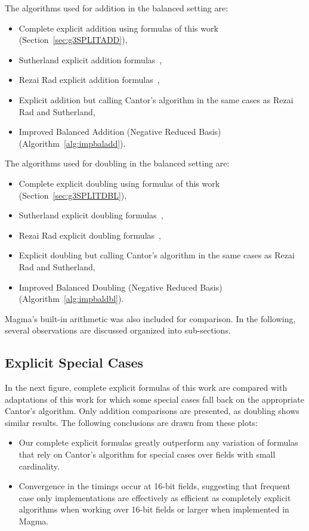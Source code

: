 The algorithms used for addition in the balanced setting are: 
\begin{itemize}
    \item Complete explicit addition using formulas of this work (Section~\ref{sec:g3SPLITADD}),
    \item Sutherland explicit addition formulas~\cite{Sutherland_g3_2019},
    \item Rezai Rad explicit addition formulas~\cite{rad2019jacobian},
    \item Explicit addition but calling Cantor's algorithm in the same cases as Rezai Rad and Sutherland,
    \item Improved Balanced Addition (Negative Reduced Basis) (Algorithm~\ref{alg:impbaladd}).
\end{itemize} 
The algorithms used for doubling in the balanced setting are: 
\begin{itemize}
    \item Complete explicit doubling using formulas of this work (Section~\ref{sec:g3SPLITDBL}),
    \item Sutherland explicit doubling formulas~\cite{Sutherland_g3_2019},
    \item Rezai Rad explicit doubling formulas~\cite{rad2019jacobian},
    \item Explicit doubling but calling Cantor's algorithm in the same cases as Rezai Rad and Sutherland,
    \item Improved Balanced Doubling (Negative Reduced Basis) (Algorithm~\ref{alg:impbaldbl}).
\end{itemize} Magma's built-in arithmetic was also included for comparison.
In the following, several observations are discussed organized into sub-sections.

\subsection{Explicit Special Cases}

In the next figure, complete explicit formulas of this work are compared
with adaptations of this work for which some special cases fall back on the appropriate
Cantor's algorithm. Only addition comparisons are presented, as
doubling shows similar results. The following conclusions are drawn from these
plots:
\begin{itemize}
    \item Our complete explicit formulas greatly outperform any
    variation of formulas that rely on Cantor's algorithm for special cases over fields
    with small cardinality.
     
    \item Convergence in the timings occur at 16-bit fields, suggesting that
    frequent case only implementations are effectively as efficient as
    completely explicit algorithms when working over 16-bit fields or larger
    when implemented in Magma.
\end{itemize}

